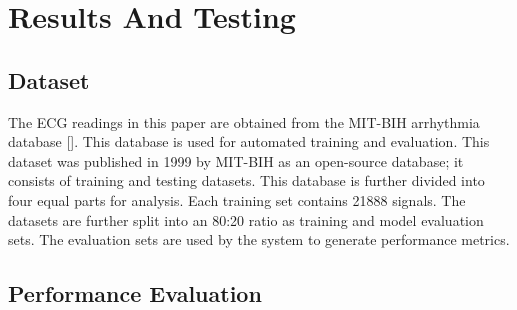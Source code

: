 \documentclass[a4paper,fleqn]{cas-dc}
\newcommand{\responsemod}{\color{blue}}
\begin{document}
% 
\section{Results And Testing} \label{sec:results_and_testing}

{\responsemod
    \subsection{Dataset}\label{subsec:dataset}
}
The ECG readings in this paper are obtained from the MIT-BIH arrhythmia database []. This database is used for automated training and evaluation. This dataset was published in 1999 by MIT-BIH as an open-source database; it consists of training and testing datasets. This database is further divided into four equal parts for analysis. {\responsemod Each training set contains 21888 signals. The datasets are further split into an 80:20 ratio as training and model evaluation sets. The evaluation sets are used by the system to generate performance metrics.}

\subsection{Performance Evaluation} \label{subsec:performance_evaluation}
\end{document}

